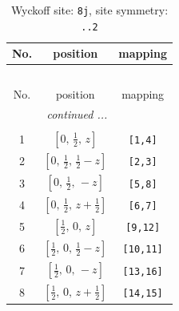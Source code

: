 \documentclass[fleqn,8pt]{jsarticle}
\begin{document}
\begin{longtable}{ccc}
\caption{Wyckoff site: {\tt 8j}, site symmetry: {\tt ..2}}
 \\
 \hline \hline
No. & position & mapping \\ \hline \endfirsthead

\multicolumn{2}{l}{\tablename\ \thetable{}} \\
 \hline \hline
No. & position & mapping \\ \hline \endhead

 \hline \hline
\multicolumn{2}{r}{\footnotesize\it continued ...} \\ \endfoot

 \hline \hline
\multicolumn{2}{r}{} \\ \endlastfoot

1 & $\left[ 0,\, \frac{1}{2},\, z \right]$ & {\tt [1,4]} \\ \hline
2 & $\left[ 0,\, \frac{1}{2},\, \frac{1}{2} - z \right]$ & {\tt [2,3]} \\ \hline
3 & $\left[ 0,\, \frac{1}{2},\, - z \right]$ & {\tt [5,8]} \\ \hline
4 & $\left[ 0,\, \frac{1}{2},\, z + \frac{1}{2} \right]$ & {\tt [6,7]} \\ \hline
5 & $\left[ \frac{1}{2},\, 0,\, z \right]$ & {\tt [9,12]} \\ \hline
6 & $\left[ \frac{1}{2},\, 0,\, \frac{1}{2} - z \right]$ & {\tt [10,11]} \\ \hline
7 & $\left[ \frac{1}{2},\, 0,\, - z \right]$ & {\tt [13,16]} \\ \hline
8 & $\left[ \frac{1}{2},\, 0,\, z + \frac{1}{2} \right]$ & {\tt [14,15]} \\
\end{longtable}
\renewcommand{\arraystretch}{1.2}
\end{document}
